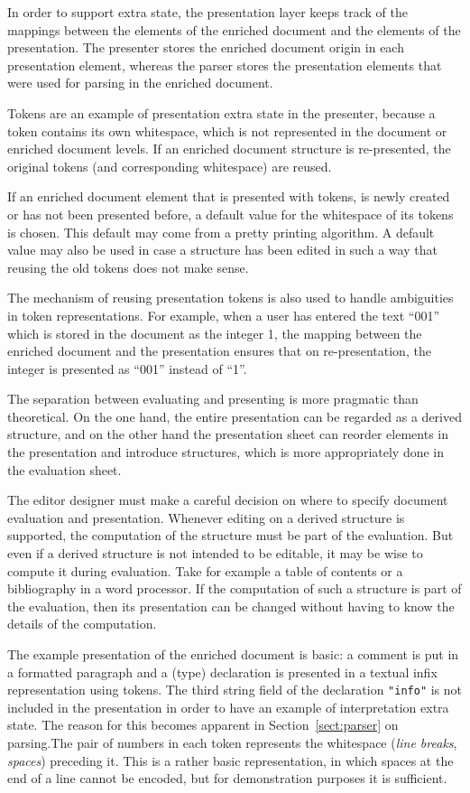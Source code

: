 \documentclass{speauth}
\begin{document}
In order to support extra state, the presentation layer keeps track of the mappings between the elements of the enriched document and the elements of the presentation. The presenter stores the enriched document origin in each presentation element, whereas the parser stores the presentation elements that were used for parsing in the enriched document.

Tokens are an example of presentation extra state in the presenter, because a token contains its own whitespace, which is not represented in the document or enriched document levels. If an enriched document structure is re-presented, the original tokens (and corresponding white\-space) are reused. 

If an enriched document element that is presented with tokens, is newly created or has not been presented before, a default value for the whitespace of its tokens is chosen. This default may come from a pretty printing algorithm. A default value may also be used in case a structure has been edited in such a way that reusing the old tokens does not make sense.

The mechanism of reusing presentation tokens is also used to handle ambiguities in token representations. For example, when a user has entered the text ``001'' which is stored in the document as the integer 1, the mapping between the enriched document and the presentation ensures that on re-presentation, the integer is presented as ``001'' instead of ``1''.

The separation between evaluating and presenting is more pragmatic than theoretical. On the one hand, the entire presentation can be regarded as a derived structure, and on the other hand the presentation sheet can reorder elements in the presentation and introduce structures, which is more appropriately done in the evaluation sheet. 

The editor designer must make a careful decision on where to specify document evaluation and presentation. Whenever editing on a derived structure is supported, the computation of the structure must be part of the evaluation. But even if a derived structure is not intended to be editable, it may be wise to compute it during evaluation. Take for example a table of contents or a bibliography in a word processor. If the computation of such a structure is part of the evaluation, then its presentation can be changed without having to know the details of the computation.

 The example presentation of the enriched document is basic: a comment is put in a formatted paragraph and a (type) declaration is presented in a textual infix representation using tokens. The third string field of the declaration \verb|"info"| is not included in the presentation in order to have an example of interpretation extra state. \bc The reason for this becomes apparent in Section~\ref{sect:parser} on parsing.\ec  The pair of numbers in each token represents the whitespace ({\em line breaks}, {\em spaces}) preceding it. This is a rather basic representation, in which spaces at the end of a line cannot be encoded, but for demonstration purposes it is sufficient.
\end{document}
